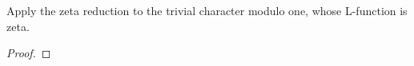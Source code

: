 \begin{theorem}
\label{rhEvery}
\leanok
Apply the zeta reduction to the trivial character modulo one, whose L-function is zeta.
\end{theorem}
\begin{proof}
\leanok
\end{proof}
